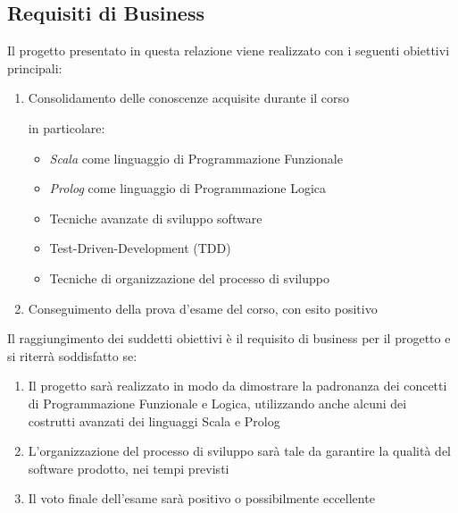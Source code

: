 \subsection{Requisiti di Business}
Il progetto presentato in questa relazione viene realizzato 
con i seguenti obiettivi principali:
\begin{enumerate}
    \item Consolidamento delle conoscenze acquisite durante il 
    corso\par in particolare:
    \begin{itemize}
        \item \emph{Scala} come linguaggio di Programmazione Funzionale
        \item \emph{Prolog} come linguaggio di Programmazione Logica
        \item Tecniche avanzate di sviluppo software
        \item Test-Driven-Development (TDD)
        \item Tecniche di organizzazione del processo di sviluppo
    \end{itemize}
    \item Conseguimento della prova d'esame del corso, con esito positivo
\end{enumerate}
Il raggiungimento dei suddetti obiettivi è il requisito di business
per il progetto e si riterrà soddisfatto se:
\begin{enumerate}
    \item Il progetto sarà realizzato in modo da dimostrare
    la padronanza dei concetti di Programmazione Funzionale e 
    Logica, utilizzando anche alcuni dei costrutti avanzati
    dei linguaggi Scala e Prolog
    \item L'organizzazione del processo di sviluppo sarà tale da
    garantire la qualità del software prodotto, nei tempi previsti
    \item Il voto finale dell'esame sarà positivo o possibilmente eccellente
\end{enumerate}